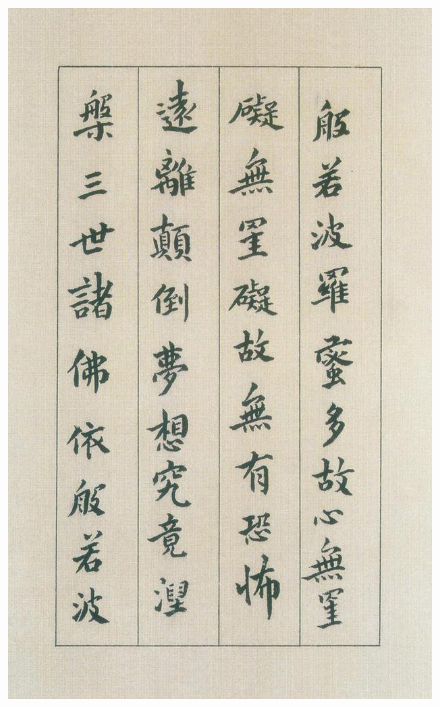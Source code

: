 \documentclass[a4paper,twoside]{article}
\begin{document}
\begin{figure}[ht]
\centering
\includegraphics[width=13.8cm]{images/fushan-5}
\end{figure}
\end{document}

